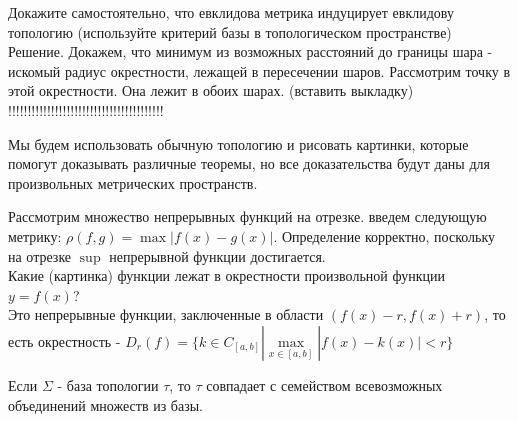 \begin{exercise}
Докажите самостоятельно, что евклидова метрика индуцирует евклидову топологию (используйте критерий базы в топологическом пространстве)\\
Решение. Докажем, что минимум из возможных расстояний до границы шара - 
искомый радиус окрестности, лежащей в пересечении шаров. Рассмотрим
точку в этой окрестности. Она лежит в обоих шарах. (вставить выкладку)\\
!!!!!!!!!!!!!!!!!!!!!!!!!!!!!!!!!!!!!!!!
\end{exercise}
\begin{remark}
Мы будем использовать обычную топологию и рисовать картинки, которые помогут доказывать различные теоремы, но все доказательства будут даны для произвольных метрических пространств. \\
\end{remark}
\begin{example}
Рассмотрим множество непрерывных функций на отрезке. введем следующую метрику: $\rho(f,g)=\max |f(x)-g(x)|$. Определение корректно, поскольку на отрезке $\sup$ непрерывной функции достигается.\\ Какие (картинка) функции лежат в окрестности произвольной функции $y=f(x)$?\\
Это непрерывные функции, заключенные в области $(f(x)-r,f(x)+r)$, то есть окрестность - $D_r(f)=\{k{\in}C_{[a,b]}|\max\limits_{x{\in}[a,b]}|f(x)-k(x)|<r\}$
\end{example}
\begin{remark}
Если $\Sigma$ - база топологии  $\tau$, то  $\tau$
совпадает с семейством всевозможных объединений множеств из базы.
\end{remark}
